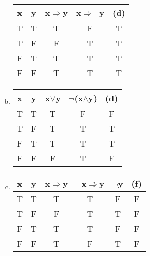 \begin{enumerate}
\begin{enumerate}[(a)]
        \begin{tabular}{c|c|c|c|c}
            x & y & x$\Rightarrow$y & x$\Rightarrow\neg$y & (d) \\ \hline
            T & T & T & F & T \\ \hline
            T & F & F & T & T \\ \hline
            F & T & T & T & T \\ \hline
            F & F & T & T & T
        \end{tabular}
        \item {} \newline
        \begin{tabular}{c|c|c|c|c}
            x & y & x$\vee$y & $\neg$(x$\wedge$y) & (d) \\ \hline
            T & T & T & F & F \\ \hline
            T & F & T & T & T \\ \hline
            F & T & T & T & T \\ \hline
            F & F & F & T & F
        \end{tabular}
        \item {} \newline
        \begin{tabular}{c|c|c|c|c|c}
            x & y & x$\Rightarrow$y & $\neg$x$\Rightarrow$y & $\neg$y & (f)\\ \hline
            T & T & T & T & F & F \\ \hline
            T & F & F & T & T & F \\ \hline
            F & T & T & T & F & F \\ \hline
            F & F & T & F & T & F
        \end{tabular}
    \end{enumerate}
    

\end{enumerate}

